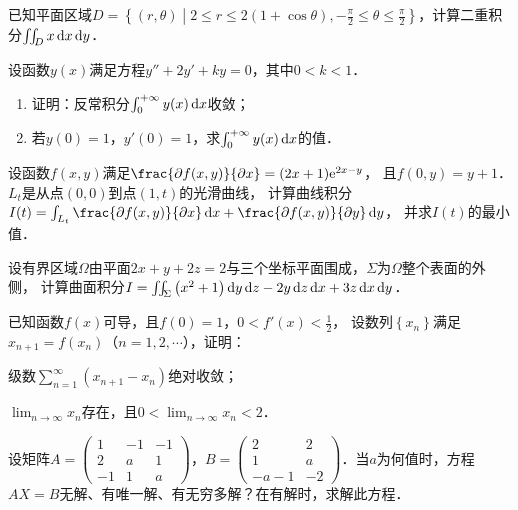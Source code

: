 \documentclass[plain,noanswer,medmath]{../../template/jnuexam}
\begin{document}


\begin{problem}[points=10]
已知平面区域$D = \left\{(r,\theta)\middle| 2 \le r \le 2(1+\cos\theta),
- \frac{\pi}{2} \le \theta \le \frac{\pi}{2} \right\}$，\goodbreak 计算二重积分$\iint_D x\mathop{}\!\mathrm{d} x\mathop{}\!\mathrm{d} y$．
\end{problem}


\begin{problem}[points=10]
设函数$y(x)$满足方程$y'' + 2y' + ky = 0$，其中$0 < k < 1$．
\begin{enumerate}
\item 证明：反常积分$\int_0^{+\infty} y(x)\mathop{}\!\mathrm{d} x$收敛；
\item 若$y(0) = 1$，$y'(0) = 1$，求$\int_0^{+\infty} y(x)\mathop{}\!\mathrm{d} x$的值．
\end{enumerate}
\end{problem}


\begin{problem}[points=10]
设函数$f(x,y)$满足$\frac{\pd f(x,y)}{\pdx} = (2x + 1)\e^{2x - y}$，
且$f(0,y) = y + 1$．$L_t$是从点$(0,0)$到点$(1,t)$的光滑曲线，
计算曲线积分$I(t) = \int_{L_t} \frac{\pd f(x,y)}{\pdx}\dx + \frac{\pd f(x,y)}{\pdy}\dy$，
并求$I(t)$的最小值．
\end{problem}


\begin{problem}[points=10]
设有界区域$\Omega$由平面$2x + y + 2z = 2$与三个坐标平面围成，$\Sigma$为$\Omega$整个表面的外侧，
计算曲面积分$I = \iint_{\Sigma}\left(x^2 + 1 \right)\mathop{}\!\mathrm{d} y\mathop{}\!\mathrm{d} z - 2y\mathop{}\!\mathrm{d} z\mathop{}\!\mathrm{d} x + 3z\mathop{}\!\mathrm{d} x\mathop{}\!\mathrm{d} y$．
\end{problem}


\begin{problem}[points=10]
已知函数$f(x)$可导，且$f(0) = 1$，$0 < f'(x) < \frac{1}{2}$，
设数列$\left\{x_n \right\}$满足$x_{n + 1} = f(x_n)$（$n = 1,2, \cdots$），证明：\par
\begin{enumerate*}
\item 级数$\mathop{\sum}\limits_{n = 1}^{\infty}(x_{n + 1} - x_n)$绝对收敛；
\item $\lim_{n \to \infty} x_n$存在，且$0 < \lim_{n \to \infty} x_n < 2$．
\end{enumerate*}
\end{problem}


\begin{problem}[points=11]
设矩阵$A = \begin{pmatrix}
   1 & -1 & -1 \\
   2 &  a & 1 \\
  -1 &  1 & a
\end{pmatrix}$，$B = \begin{pmatrix}
       2 & 2 \\
       1 & a \\
  -a - 1 & -2
\end{pmatrix}$．当$a$为何值时，方程$AX = B$无解、有唯一解、有无穷多解？在有解时，求解此方程．
\end{problem}
\end{document}
